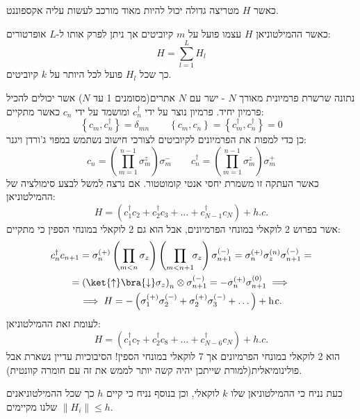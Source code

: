 \documentclass{tstextbook}
\begin{document}
כאשר \(H\) מטריצה גדולה יכול להיות מאוד מורכב לעשות עליה אקספוננט. 

\begin{definition}
כאשר ההמילטוניאן \(H\) עצמו פועל על \(m\) קיוביטים אך ניתן לפרק אותו ל-\(L\) אופרטורים:
$$H=\sum_{l=1}^{L}H_{l}$$
כך שכל \(H_{l}\) פועל לכל היותר על \(k\) קיוביטים.

\end{definition}
\begin{example}
נתונה שרשרת פרמיונית מאורך \(N\) - ישר עם \(N\) אתרים(מסומנים 1 עד \(N\)) אשר יכולים להכיל פרמיון יחיד. פרמיון נוצר על ידי \(c_{n}^{\dagger}\) ומושמד על ידי \(c_{n}\) כאשר מתקיים:
$$\left\{  c_{m},c_{n}^{\dagger}  \right\}=\delta_{mn}\qquad \left\{c_{m},c_{n}\right\}=\left\{c_{m}^{\dagger},c_{n}^{\dagger}\right\}=0$$
כן כדי למפות את הפרמיונים לקיוביטים לצורכי חישוב נשתמש במפוי ג'ורדן ויגנר:
$$c_{n}=\left(\prod_{m=1}^{n-1}\sigma_{m}^{z}\right)\sigma_{m}^{-}\qquad c_{n}^{\dagger}=\left(\prod_{m=1}^{n-1}\sigma_{m}^{z}\right)\sigma_{m}^{+}$$
כאשר העתקה זו משמרת יחסי אנטי קומוטטור. אם נרצה למשל לבצע סימולציה של ההמילטוניאן:
$$H=\left(c_{1}^{\dagger}c_{2}+c_{2}^{\dagger}c_{3}+\ldots+c_{N-1}^{\dagger}c_{N}\right)+h.c.$$
אשר בפרוש 2 לוקאלי במונחי הפרמיונים, אבל הוא גם 2 לוקאלי במונחי הספין כי מתקיים:
\begin{gather*}c_{n}^{\dagger}c_{n+1}=\sigma^{(+)}_{n}\left( \prod_{m<n}\sigma_{z} \right)\left( \prod_{m<n+1}\!\!\sigma_{z} \right)\sigma_{n+1}^{(-)}=\sigma_{n}^{(+)}\sigma_{z}^{(n)}\sigma_{n+1}^{(-)} = \\=\left( \ket{\uparrow } \bra{\downarrow } \sigma_{z} \right)_{n}\otimes \sigma_{n+1}^{(-)}=-\sigma_{n}^{(+)}\sigma_{n+1}^{(0)}\implies \\\implies H=-\left( \sigma_{1}^{(+)}\sigma_{2}^{(-)}+\sigma_{2}^{(+)}\sigma_{3}^{(-)} +\dots \right)+ \mathrm{h.\!c.}
\end{gather*}
לעומת זאת ההמילטוניאן:
$$H=\left(c_{1}^{\dagger}c_{7}+c_{2}^{\dagger}c_{8}+\ldots+c_{N-6}^{\dagger}c_{N}\right)+h.c.$$
הוא 2 לוקאלי במונחי הפרמיונים אך 7 לוקאלי במונחי הספין! הסיבוכיות עדיין נשארת אבל פולינומיאלית(למורת שייתכן יהיה קשה יותר לממש את זה עם חומרה קוונטית).

\end{example}
כעת נניח כי ההמילטוניאן שלו \(k\) לוקאלי, וכן בנוסף נניח כי קיים \(h\) כך שכל ההמילטוניאנים שלנו מקיימים \(\lVert H_{i} \rVert\leq h\).
\end{document}
